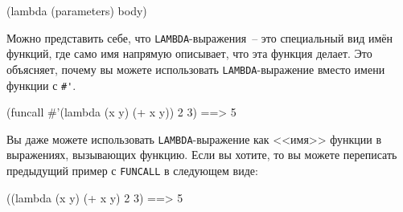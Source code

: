 \begin{myverb}
(lambda (parameters) body)
\end{myverb}

Можно представить себе, что \lstinline{LAMBDA}-выражения~-- это специальный вид имён функций,
где само имя напрямую описывает, что эта функция делает.  Это объясняет, почему вы можете
использовать \lstinline{LAMBDA}-выражение вместо имени функции с \lstinline!#'!.

\begin{myverb}
(funcall #'(lambda (x y) (+ x y)) 2 3) ==> 5
\end{myverb}

Вы даже можете использовать \lstinline{LAMBDA}-выражение как <<имя>> функции в выражениях,
вызывающих функцию.  Если вы хотите, то вы можете переписать предыдущий пример с
\lstinline{FUNCALL} в следующем виде:

\begin{myverb}
((lambda (x y) (+ x y) 2 3) ==> 5
\end{myverb}

